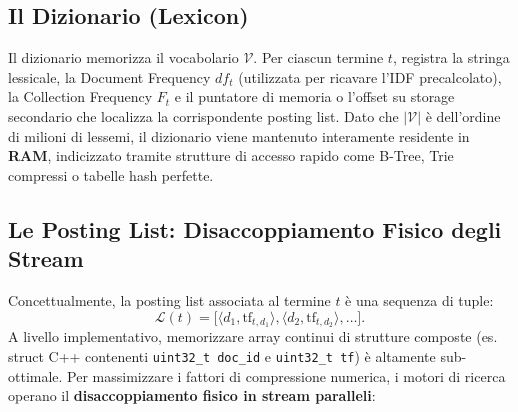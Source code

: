 \FloatBarrier
\subsection{Il Dizionario (Lexicon)}
\label{subsec:dizionario-lexicon}
Il dizionario memorizza il vocabolario $\mathcal{V}$. Per ciascun termine $t$, registra la stringa lessicale, la Document Frequency $df_t$ (utilizzata per ricavare l'IDF precalcolato), la Collection Frequency $F_t$ e il puntatore di memoria o l'offset su storage secondario che localizza la corrispondente posting list.
Dato che $|\mathcal{V}|$ \`e dell'ordine di milioni di lessemi, il dizionario viene mantenuto interamente residente in \textbf{RAM}, indicizzato tramite strutture di accesso rapido come B-Tree, Trie compressi o tabelle hash perfette.

\FloatBarrier
\subsection{Le Posting List: Disaccoppiamento Fisico degli Stream}
\label{subsec:disaccoppiamento-stream}
Concettualmente, la posting list associata al termine $t$ \`e una sequenza di tuple:
\begin{equation}
\mathcal{L}(t) = \big[ \langle d_1, \text{tf}_{t,d_1} \rangle, \langle d_2, \text{tf}_{t,d_2} \rangle, \dots \big].
\end{equation}
A livello implementativo, memorizzare array continui di strutture composte (es. struct C++ contenenti \texttt{uint32\_t doc\_id} e \texttt{uint32\_t tf}) \`e altamente sub-ottimale. Per massimizzare i fattori di compressione numerica, i motori di ricerca operano il \textbf{disaccoppiamento fisico in stream paralleli}:

